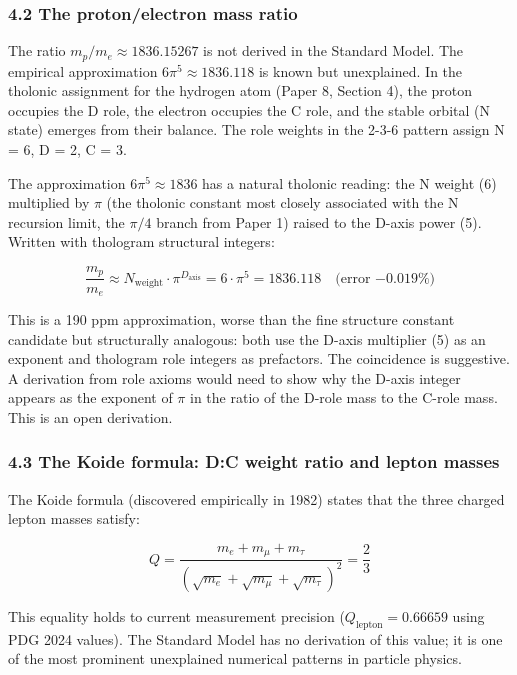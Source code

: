 \documentclass[
  11pt,
  letterpaper,
]{article}
\begin{document}
\subsubsection{4.2 The proton/electron mass
ratio}\label{the-protonelectron-mass-ratio}

The ratio \(m_p / m_e \approx 1836.15267\) is not derived in the
Standard Model. The empirical approximation \(6\pi^5 \approx 1836.118\)
is known but unexplained. In the tholonic assignment for the hydrogen
atom (Paper 8, Section 4), the proton occupies the D role, the electron
occupies the C role, and the stable orbital (N state) emerges from their
balance. The role weights in the 2-3-6 pattern assign N = 6, D = 2, C =
3.

The approximation \(6\pi^5 \approx 1836\) has a natural tholonic
reading: the N weight (6) multiplied by \(\pi\) (the tholonic constant
most closely associated with the N recursion limit, the \(\pi/4\) branch
from Paper 1) raised to the D-axis power (5). Written with thologram
structural integers:

\[\frac{m_p}{m_e} \approx N_{\text{weight}} \cdot \pi^{D_{\text{axis}}} = 6 \cdot \pi^5 = 1836.118 \quad \text{(error } {-0.019\%)}\]

This is a 190 ppm approximation, worse than the fine structure constant
candidate but structurally analogous: both use the D-axis multiplier (5)
as an exponent and thologram role integers as prefactors. The
coincidence is suggestive. A derivation from role axioms would need to
show why the D-axis integer appears as the exponent of \(\pi\) in the
ratio of the D-role mass to the C-role mass. This is an open derivation.

\subsubsection{4.3 The Koide formula: D:C weight ratio and lepton
masses}\label{the-koide-formula-dc-weight-ratio-and-lepton-masses}

The Koide formula (discovered empirically in 1982) states that the three
charged lepton masses satisfy:

\[Q = \frac{m_e + m_\mu + m_\tau}{(\sqrt{m_e} + \sqrt{m_\mu} + \sqrt{m_\tau})^2} = \frac{2}{3}\]

This equality holds to current measurement precision
(\(Q_{\text{lepton}} = 0.66659\) using PDG 2024 values). The Standard
Model has no derivation of this value; it is one of the most prominent
unexplained numerical patterns in particle physics.
\end{document}
